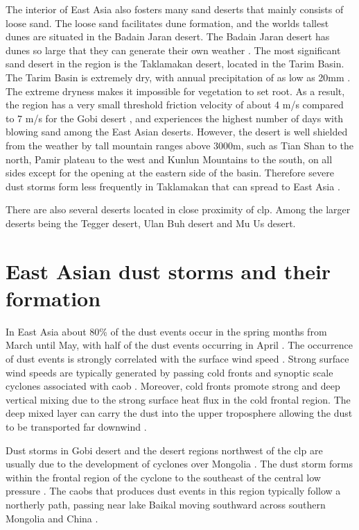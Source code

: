 The interior of East Asia also fosters many sand deserts that mainly consists of loose sand. 
The loose sand facilitates dune formation, and the worlds tallest dunes are situated in the Badain Jaran desert. 
The Badain Jaran desert has dunes so large that they can generate their own weather \parencite{dong2013investigation}. 
The most significant sand desert in the region is the Taklamakan desert, located in the Tarim Basin. 
The Tarim Basin is extremely dry, with annual precipitation of as low as 20mm \parencite{shao2006review}. 
The extreme dryness makes it impossible for vegetation to set root. As a result, the region has a very small threshold friction velocity of about 4 m/s compared to 7 m/s for the Gobi desert \parencite{ShaoYaping2008PaMo}, and experiences the highest number of days with blowing sand among the East Asian deserts.
However, the desert is well shielded from the weather by tall mountain ranges above 3000m, such as Tian Shan to the north, Pamir plateau to the west and Kunlun Mountains to the south,  on all sides except for the opening at the eastern side of the basin. 
Therefore severe dust storms form less frequently in Taklamakan that can spread to East Asia \parencite{ShaoYaping2008PaMo}. 

There are also several deserts located in close proximity of \acrshort{clp}. Among the larger deserts being the Tegger desert, Ulan Buh desert and Mu Us desert. 


\section{East Asian dust storms and their formation}

In East Asia about 80\% of the dust events occur in the spring months from March until May, with half of the dust events occurring in April \parencite{sun2001spatial}. 
The occurrence of dust events is strongly correlated with the surface wind speed \parencite{kurosaki2003recent}. 
Strong surface wind speeds are typically generated by passing cold fronts and synoptic scale cyclones associated with \acrfull{caob} \parencite{sun2001spatial, zhou2003typical, takemi2005dust}.
Moreover, cold fronts promote strong and deep vertical mixing due to the strong surface heat flux in the cold frontal region. The deep mixed layer can carry the dust into the upper troposphere allowing the dust to be transported far downwind \parencite{liu2003high}. 
  
Dust storms in Gobi desert and the desert regions northwest of the \acrshort{clp} are usually due to the development of cyclones over Mongolia \parencite{shao2006review}. 
The dust storm forms within the frontal region of the cyclone to the southeast of the central low pressure \parencite{takemi2005dust}. 
The \acrshort{caob}s that produces dust events in this region typically follow a northerly path, passing near lake Baikal moving southward across southern Mongolia and China \parencite{sun2001spatial}. 

